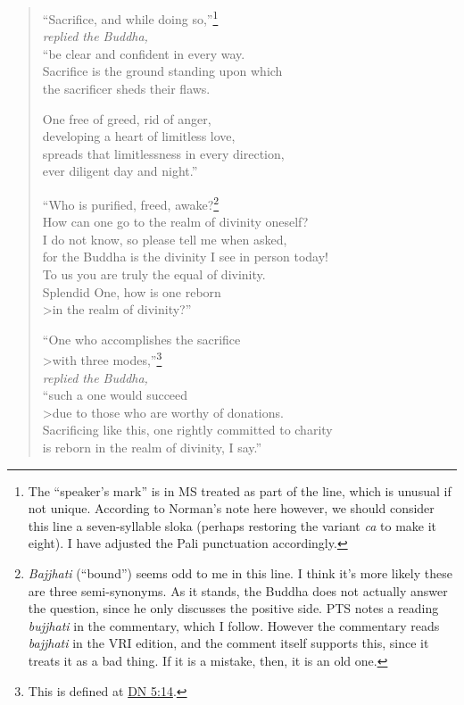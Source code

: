 \documentclass[12pt,openany]{book}%
\newcommand*{\scspeaker}[1]{\hspace{2em}\textit{#1}}
\begin{document}
\begin{verse}
“Sacrifice, and while doing so,”\footnote{The “speaker’s mark” is in MS treated as part of the line, which is unusual if not unique. According to Norman’s note here however, we should consider this line a seven-syllable sloka (perhaps restoring the variant \textit{ca} to make it eight). I have adjusted the Pali punctuation accordingly. } \\
\scspeaker{replied the Buddha, }\\
“be clear and confident in every way. \\
Sacrifice is the ground standing upon which \\
the sacrificer sheds their flaws. 

One free of greed, rid of anger, \\
developing a heart of limitless love, \\
spreads that limitlessness in every direction, \\
ever diligent day and night.” 

“Who is purified, freed, awake?\footnote{\textit{Bajjhati} (“bound”) seems odd to me in this line. I think it’s more likely these are three semi-synonyms. As it stands, the Buddha does not actually answer the question, since he only discusses the positive side. PTS notes a reading \textit{bujjhati} in the commentary, which I follow. However the commentary reads \textit{bajjhati} in the VRI edition, and the comment itself supports this, since it treats it as a bad thing. If it is a mistake, then, it is an old one. } \\
How can one go to the realm of divinity oneself? \\
I do not know, so please tell me when asked, \\
for the Buddha is the divinity I see in person today! \\
To us you are truly the equal of divinity. \\
Splendid One, how is one reborn \\>in the realm of divinity?” 

“One who accomplishes the sacrifice \\>with three modes,”\footnote{This is defined at \href{https://suttacentral.net/dn5/en/sujato\#14}{DN 5:14}. } \\
\scspeaker{replied the Buddha, }\\
“such a one would succeed \\>due to those who are worthy of donations. \\
Sacrificing like this, one rightly committed to charity \\
is reborn in the realm of divinity, I say.” 

%
\end{verse}
\end{document}

